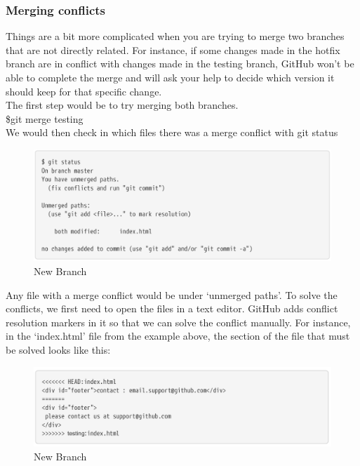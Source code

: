 \documentclass{article}
\begin{document}
    \subsubsection{Merging conflicts}
    Things are a bit more complicated when you are trying to merge two branches that are not directly related. For instance, if some changes made in the hotfix branch are in conflict with changes made in the testing branch, GitHub won't be able to complete the merge and will ask your help to decide which version it should keep for that specific change. \\
    \newline
    The first step would be to try merging both branches. \\
    \newline    
    \indent \$git merge testing \\
    \newline
    We would then check in which files there was a merge conflict with git status   
    \begin{figure}[H]
    	\caption{New Branch}
    	\includegraphics[scale=0.5]{images/figure9.png}
    	\centering
    \end{figure} 
    Any file with a merge conflict would be under `unmerged paths'. To solve the conflicts, we first need to open the files in a text editor. GitHub adds conflict resolution markers in it so that we can solve the conflict manually. For instance, in the `index.html' file from the example above, the section of the file that must be solved looks like this:
    \begin{figure}[H]
    	\caption{New Branch}
    	\includegraphics[scale=0.5]{images/figure10.png}
    	\centering
    \end{figure} 
\end{document}
